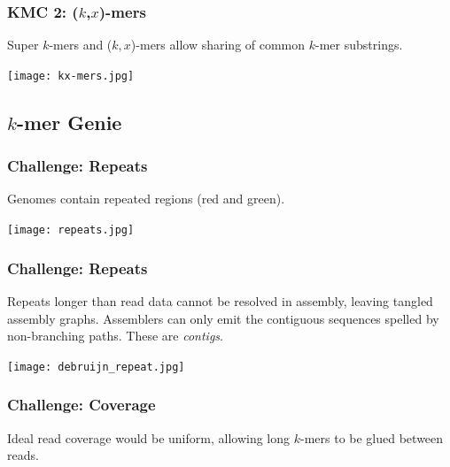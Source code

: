 \documentclass{beamer}
\begin{document}
\begin{frame}
\frametitle{KMC 2: ($k$,$x$)-mers}
Super $k$-mers and ($k,x$)-mers allow sharing of common $k$-mer substrings.

\texttt{[image: kx-mers.jpg]}

\end{frame}

\subsection{$k$-mer Genie}
\begin{frame}
\frametitle{Challenge: Repeats}
Genomes contain repeated regions (red and green).

\texttt{[image: repeats.jpg]}
% 
\end{frame}


\begin{frame}
\frametitle{Challenge: Repeats}
Repeats longer than read data cannot be resolved in assembly, leaving tangled assembly graphs.  Assemblers can only emit the contiguous sequences spelled by non-branching paths.  These are \emph{contigs}.

\texttt{[image: debruijn\_repeat.jpg]}
% 
\end{frame}


\begin{frame}
\frametitle{Challenge: Coverage}

Ideal read coverage would be uniform, allowing long $k$-mers to be glued between reads.


% 
\end{frame}
\end{document}
